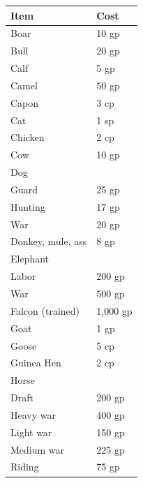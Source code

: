\begin{multicols}{2}
\begin{minipage}{\columnwidth}
\label{animals}
\noindent
\begin{tabular}{|p{}|p{}|}
\hline
Item				& Cost \\
\hline\hline
\rowcolor[gray]{.9}Boar				& 10 gp \\
Bull				& 20 gp \\
\rowcolor[gray]{.9}Calf				& 5 gp \\
Camel				& 50 gp \\
\rowcolor[gray]{.9}Capon				& 3 cp \\
Cat					& 1 sp \\
\rowcolor[gray]{.9}Chicken				& 2 cp \\
Cow					& 10 gp \\
\rowcolor[gray]{.9}Dog					&  \\
\rowcolor[gray]{.9}\hspace{1em}Guard				& 25 gp \\
\hspace{1em}Hunting			& 17 gp \\
\rowcolor[gray]{.9}\hspace{1em}War				& 20 gp \\
Donkey, mule, ass	& 8 gp \\
\rowcolor[gray]{.9}Elephant			&  \\
\rowcolor[gray]{.9}\hspace{1em}Labor				& 200 gp \\
\hspace{1em}War				& 500 gp \\
\rowcolor[gray]{.9}Falcon (trained)	& 1,000 gp \\
Goat				& 1 gp \\
\rowcolor[gray]{.9}Goose				& 5 cp \\
Guinea Hen			& 2 cp \\
\rowcolor[gray]{.9}Horse				&  \\
\rowcolor[gray]{.9}\hspace{1em}Draft				& 200 gp \\
\hspace{1em}Heavy war			& 400 gp \\
\rowcolor[gray]{.9}\hspace{1em}Light war			& 150 gp \\
\hspace{1em}Medium war		& 225 gp \\
\rowcolor[gray]{.9}\hspace{1em}Riding			& 75 gp \\

\end{tabular}
\end{minipage}
\end{multicols}
